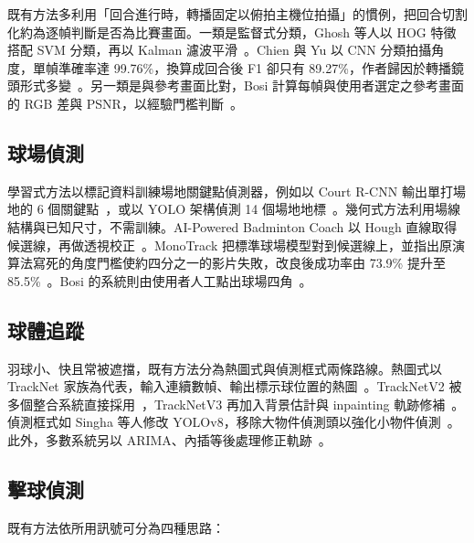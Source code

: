 既有方法多利用「回合進行時，轉播固定以俯拍主機位拍攝」的慣例，把回合切割化約為逐幀判斷是否為比賽畫面。一類是監督式分類，Ghosh 等人以 HOG 特徵搭配 SVM 分類，再以 Kalman 濾波平滑~\cite{ghosh2018structured}。Chien 與 Yu 以 CNN 分類拍攝角度，單幀準確率達 99.76\%，換算成回合後 F1 卻只有 89.27\%，作者歸因於轉播鏡頭形式多變~\cite{chien2023hitframe}。另一類是與參考畫面比對，Bosi 計算每幀與使用者選定之參考畫面的 RGB 差與 PSNR，以經驗門檻判斷~\cite{bosi2021thesis}。

\subsection{球場偵測}

學習式方法以標記資料訓練場地關鍵點偵測器，例如以 Court R-CNN 輸出單打場地的 6 個關鍵點~\cite{chien2023hitframe}，或以 YOLO 架構偵測 14 個場地地標~\cite{singha2025hybrid}。幾何式方法利用場線結構與已知尺寸，不需訓練。AI-Powered Badminton Coach 以 Hough 直線取得候選線，再做透視校正~\cite{guo2025coach}。MonoTrack 把標準球場模型對到候選線上，並指出原演算法寫死的角度門檻使約四分之一的影片失敗，改良後成功率由 73.9\% 提升至 85.5\%~\cite{monotrack}。Bosi 的系統則由使用者人工點出球場四角~\cite{bosi2021thesis}。

\subsection{球體追蹤}

羽球小、快且常被遮擋，既有方法分為熱圖式與偵測框式兩條路線。熱圖式以 TrackNet 家族為代表，輸入連續數幀、輸出標示球位置的熱圖~\cite{tracknet}。TrackNetV2 被多個整合系統直接採用~\cite{guo2025coach,bosi2021thesis}，TrackNetV3 再加入背景估計與 inpainting 軌跡修補~\cite{tracknetv3}。偵測框式如 Singha 等人修改 YOLOv8，移除大物件偵測頭以強化小物件偵測~\cite{singha2025hybrid}。此外，多數系統另以 ARIMA、內插等後處理修正軌跡~\cite{guo2025coach,bosi2021thesis}。

\subsection{擊球偵測}

既有方法依所用訊號可分為四種思路：

